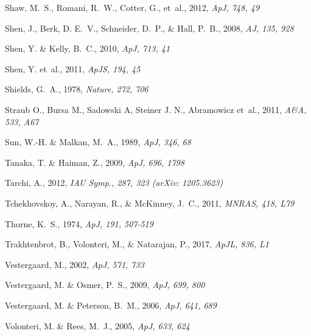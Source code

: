 \documentclass{aa}
\begin{document}
\begin{thebibliography}{}
Shaw, M.~S., Romani, R.~W., Cotter, G., et~al., 2012,
\newblock \emph{ApJ, 748, 49}

Shen, J., Berk, D. E.~V., Schneider, D.~P., \& Hall, P.~B., 2008,
\newblock \emph{AJ, 135, 928}

Shen, Y. \& Kelly, B.~C., 2010,
\newblock \emph{ApJ, 713, 41}

Shen, Y. et~al., 2011,
\newblock \emph{ApJS, 194, 45}

Shields, G.~A., 1978,
\newblock \emph{Nature, 272, 706}

Straub O., Bursa M., Sadowski A, Steiner J. N., Abramowicz et~al., 2011,
\newblock \emph{A\&A, 533, A67}

Sun, W.-H. \& Malkan, M.~A., 1989,
\newblock \emph{ApJ, 346, 68}

Tanaka, T. \& Haiman, Z., 2009,
\newblock \emph{ApJ, 696, 1798}

Tarchi, A., 2012,
\newblock \emph{IAU Symp., 287, 323 (arXiv: 1205.3623)}

Tchekhovskoy, A., Narayan, R., \& McKinney, J.~C., 2011,
\newblock \emph{MNRAS, 418, L79}

Thorne, K.~S., 1974,
\newblock \emph{ApJ, 191, 507-519}

Trakhtenbrot, B., Volonteri, M., \& Natarajan, P., 2017,
\newblock \emph{ApJL, 836, L1}

Vestergaard, M., 2002,
\newblock \emph{ApJ, 571, 733}

Vestergaard, M. \& Osmer, P.~S., 2009,
\newblock \emph{ApJ, 699, 800}

Vestergaard, M. \& Peterson, B.~M., 2006,
\newblock \emph{ApJ, 641, 689}

Volonteri, M. \& Rees, M.~J., 2005,
\newblock \emph{ApJ, 633, 624}


\end{thebibliography}
\end{document}
